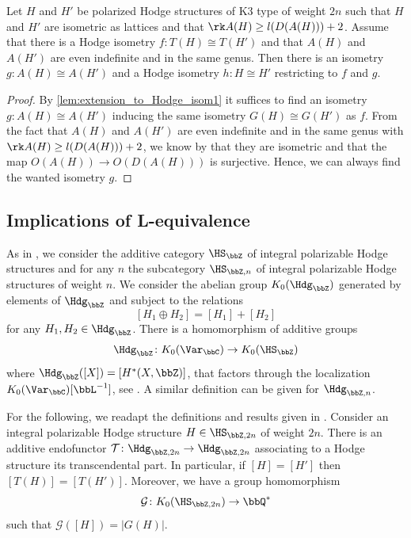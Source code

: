 \documentclass{amsart}
\begin{document}
\begin{lemma}\label{lem:extension_to_Hodge_isom2}
Let \(H\) and \(H'\) be polarized Hodge structures of K3 type of weight \(2n\) such that \(H\) and \(H'\) are isometric as lattices and that \(\rk A(H) \geq l(D({A(H)}))+2\). Assume that there is a Hodge isometry \(f\colon T(H)\cong T(H')\) and that \(A(H)\) and \(A(H')\) are even indefinite and in the same genus. Then there is an isometry \(g\colon A(H)\cong A(H')\) and a Hodge isometry \(h\colon H\cong H'\) restricting to \(f\) and \(g\).
\end{lemma}
\begin{proof}
    By \autoref{lem:extension_to_Hodge_isom1} it suffices to find an isometry \(g\colon A(H)\cong A(H')\) inducing the same isometry \(G(H)\cong G(H')\) as \(f\). From the fact that \(A(H)\) and \(A(H')\) are even indefinite and in the same genus with \(\rk A(H)\geq l(D({A(H)}))+2\), we know by \cite[Theorem 1.14.2]{Nikulin_integral} that they are isometric and that the map \(O(A(H))\to O(D({A(H)}))\) is surjective. Hence, we can always find the wanted isometry \(g\).
\end{proof}
\subsection{Implications of L-equivalence}

As in \cite{efimov2018some}, we consider the additive category \(\HS_{\bbZ}\) of integral polarizable Hodge structures and for any \(n\) the subcategory \(\HS_{\bbZ,n}\) of integral polarizable Hodge structures of weight \(n\). 
We consider the abelian group \(K_0(\Hdg_{\bbZ})\) generated by elements of \(\Hdg_{\bbZ}\) and subject to the relations \[[H_1\oplus H_2]=[H_1]+[H_2]\] for any \(H_1,H_2\in \Hdg_\bbZ\).
There is a homomorphism of additive groups
\[\Hdg_{\bbZ}\colon K_0(\Var_\bbC)\to K_0(\HS_{\bbZ})\] 
where \(\Hdg_{\bbZ}([X])=[H^*(X,\bbZ)]\), that factors through the localization \(K_0(\Var_\bbC)[\bbL^{-1}]\), see \cite{efimov2018some}. A similar definition can be given for \(\Hdg_{\bbZ,n}\).

For the following, we readapt the definitions and results given in \cite[Section 4]{meinsma2024equivalence}.
Consider an integral polarizable Hodge structure \(H\in \HS_{\bbZ,2n}\) of weight \(2n\). 
There is an additive endofunctor \(\mathcal{T}\colon \Hdg_{\bbZ,2n}\to \Hdg_{\bbZ,2n} \) associating to a Hodge structure its transcendental part. In particular, if \([H]=[H']\) then \([T(H)]=[T(H')]\).
Moreover, we have a group homomorphism 
\[\mathcal{G}\colon K_0(\HS_{\bbZ,2n})\to \bbQ^*\] 
such that \(\mathcal{G}([H])=|G(H)|\).
\end{document}
